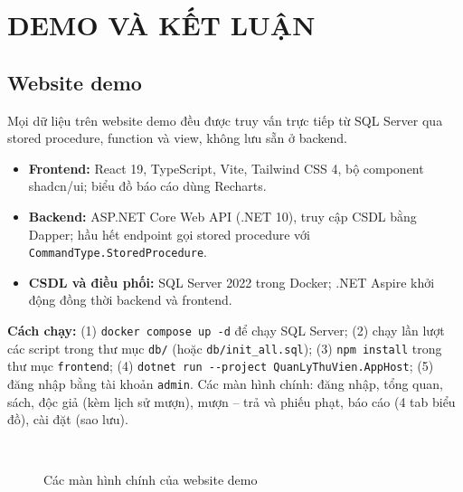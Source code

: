 \documentclass[13pt,a4paper,oneside]{extreport}
\begin{document}
\chapter{DEMO VÀ KẾT LUẬN}
\section{Website demo}
Mọi dữ liệu trên website demo đều được truy vấn trực tiếp từ SQL Server qua stored procedure, function và view, không lưu sẵn ở backend.
\begin{itemize}
\item \textbf{Frontend:} React 19, TypeScript, Vite, Tailwind CSS 4, bộ component shadcn/ui; biểu đồ báo cáo dùng Recharts.
\item \textbf{Backend:} ASP.NET Core Web API (.NET 10), truy cập CSDL bằng Dapper; hầu hết endpoint gọi stored procedure với \texttt{CommandType.StoredProcedure}.
\item \textbf{CSDL và điều phối:} SQL Server 2022 trong Docker; .NET Aspire khởi động đồng thời backend và frontend.
\end{itemize}
\textbf{Cách chạy:} (1) \texttt{docker compose up -d} để chạy SQL Server; (2) chạy lần lượt các script trong thư mục \texttt{db/} (hoặc \texttt{db/init\_all.sql}); (3) \texttt{npm install} trong thư mục \texttt{frontend}; (4) \texttt{dotnet run -{}-project QuanLyThuVien.AppHost}; (5) đăng nhập bằng tài khoản \texttt{admin}. Các màn hình chính: đăng nhập, tổng quan, sách, độc giả (kèm lịch sử mượn), mượn -- trả và phiếu phạt, báo cáo (4 tab biểu đồ), cài đặt (sao lưu).
\begin{figure}[H]
\centering
\begin{minipage}{0.48\textwidth}\centering{}\end{minipage}\hfill
\begin{minipage}{0.48\textwidth}\centering{}\end{minipage}\\[2mm]
\begin{minipage}{0.48\textwidth}\centering{}\end{minipage}\hfill
\begin{minipage}{0.48\textwidth}\centering{}\end{minipage}
\caption{Các màn hình chính của website demo}
\end{figure}
\end{document}
